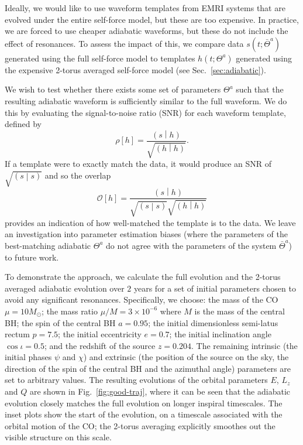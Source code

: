 \documentclass[aps,prd,amsfonts,amssymb,amsmath,nofootinbib,reprint,showpacs,superscriptaddress,twocolumn]{revtex4}
\newcommand{\figref}[1]{Fig.\ \ref{fig:#1}}
\newcommand{\secref}[1]{Sec.\ \ref{sec:#1}}
\newcommand{\overlap}[2]{\ensuremath{\left(#1\middle|#2\right)}}
\begin{document}
Ideally, we would like to use waveform templates from EMRI systems that are evolved under the entire self-force model, but these are too expensive. In practice, we are forced to use cheaper adiabatic waveforms, but these do not include the effect of resonances. To assess the impact of this, we compare data $s(t;\bar{\Theta}^a)$ generated using the full self-force model to templates $h(t;\Theta^a)$ generated using the expensive 2-torus averaged self-force model (see \secref{adiabatic}).

We wish to test whether there exists some set of parameters $\Theta^a$ such that the resulting adiabatic waveform is sufficiently similar to the full waveform. We do this by evaluating the signal-to-noise ratio (SNR) for each waveform template, defined by
\begin{equation}
\rho\left[h\right] = \frac{\overlap{s}{h}}{\sqrt{\overlap{h}{h}}}.
\end{equation}
If a template were to exactly match the data, it would produce an SNR of $\sqrt{\overlap{s}{s}}$ and so the overlap
\begin{equation}
\label{eq:overlap}
\mathcal{O}\left[h\right] = \frac{\overlap{s}{h}}{\sqrt{\overlap{s}{s}}\sqrt{\overlap{h}{h}}}
\end{equation}
provides an indication of how well-matched the template is to the data. We leave an investigation into parameter estimation biases (where the parameters of the best-matching adiabatic $\Theta^a$ do not agree with the parameters of the system $\bar{\Theta}^a$) to future work.

To demonstrate the approach, we calculate the full evolution and the 2-torus averaged adiabatic evolution over $2$ years for a set of initial parameters chosen to avoid any significant resonances. Specifically, we choose: the mass of the CO $\mu = 10 M_{\odot}$; the mass ratio $\mu / M = 3\times 10^{-6}$ where $M$ is the mass of the central BH; the spin of the central BH $a=0.95$; the initial dimensionless semi-latus rectum $p=7.5$; the initial eccentricity $e=0.7$; the initial inclination angle $\cos \iota = 0.5$; and the redshift of the source $z=0.204$. The remaining intrinsic (the initial phases $\psi$ and $\chi$) and extrinsic (the position of the source on the sky, the direction of the spin of the central BH and the azimuthal angle) parameters are set to arbitrary values. The resulting evolutions of the orbital parameters $E$, $L_z$ and $Q$ are shown in \figref{good-traj}, where it can be seen that the adiabatic evolution closely matches the full evolution on longer inspiral timescales. The inset plots show the start of the evolution, on a timescale associated with the orbital motion of the CO; the 2-torus averaging explicitly smoothes out the visible structure on this scale.
\end{document}
